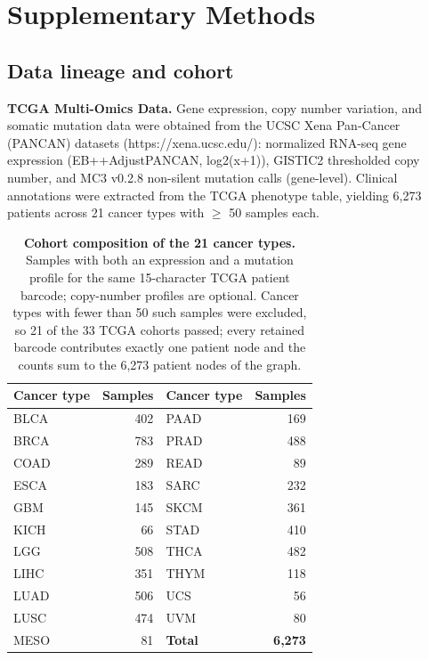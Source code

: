 \documentclass[11pt,a4paper]{article}
\begin{document}
\section{Supplementary Methods}

\subsection{Data lineage and cohort}

\textbf{TCGA Multi-Omics Data.} Gene expression, copy number variation, and somatic mutation data were obtained from the UCSC Xena Pan-Cancer (PANCAN) datasets (https://xena.ucsc.edu/): normalized RNA-seq gene expression (EB++AdjustPANCAN, log2(x+1)), GISTIC2 thresholded copy number, and MC3 v0.2.8 non-silent mutation calls (gene-level). Clinical annotations were extracted from the TCGA phenotype table, yielding 6,273 patients across 21 cancer types with $\geq$ 50 samples each.

\begin{table}[H]
\centering
\caption{\textbf{Cohort composition of the 21 cancer types.} Samples with both an expression and a mutation profile for the same 15-character TCGA patient barcode; copy-number profiles are optional. Cancer types with fewer than 50 such samples were excluded, so 21 of the 33 TCGA cohorts passed; every retained barcode contributes exactly one patient node and the counts sum to the 6,273 patient nodes of the graph.}
\label{tab:s25}
\footnotesize
\begin{tabular}{@{}lrlr@{}}
\toprule
\textbf{Cancer type} & \textbf{Samples} & \textbf{Cancer type} & \textbf{Samples} \\
\midrule
BLCA & 402 & PAAD & 169 \\
BRCA & 783 & PRAD & 488 \\
COAD & 289 & READ & 89 \\
ESCA & 183 & SARC & 232 \\
GBM & 145 & SKCM & 361 \\
KICH & 66 & STAD & 410 \\
LGG & 508 & THCA & 482 \\
LIHC & 351 & THYM & 118 \\
LUAD & 506 & UCS & 56 \\
LUSC & 474 & UVM & 80 \\
MESO & 81 & \textbf{Total} & \textbf{6,273} \\
\bottomrule
\end{tabular}
\end{table}
\end{document}
